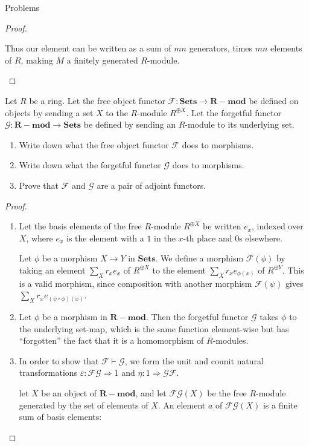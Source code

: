 \documentclass[12pt]{article}
\theoremstyle{definition}
\newenvironment{problem}[2][Problem]{\begin{trivlist}
\item[\hskip \labelsep {\bfseries #1}\hskip \labelsep {\bfseries #2.}]}{\end{trivlist}}
\begin{document}
\begin{section}{Problems}
\begin{proof}
\begin{enumerate}[label=(\alph*)]
			Thus our element can be written as a sum of $mn$ generators, times $mn$ elements of $R$, making $M$ a finitely generated $R$-module.
	\end{enumerate} 
\end{proof}
\begin{problem}{2}
	Let $R$ be a ring. Let the free object functor $\mathcal{F} : \mathbf{Sets} \to \mathbf{R-mod}$ be defined on objects by sending a set $X$ to the $R$-module $R^{\oplus X}$. Let the forgetful functor $\mathcal{G} : \mathbf{R-mod} \to \mathbf{Sets}$ be defined by sending an $R$-module to its underlying set.
	\begin{enumerate}[label=(\alph*)]
		\item Write down what the free object functor $\mathcal{F}$ does to morphisms.
		\item Write down what the forgetful functor $\mathcal{G}$ does to morphisms.
		\item Prove that $\mathcal{F}$ and $\mathcal{G}$ are a pair of adjoint functors.
	\end{enumerate}
\end{problem}
\begin{proof}
	\begin{enumerate}[label=(\alph*)]
		\item Let the basis elements of the free $R$-module $R^{\oplus X}$ be written $e_x$, indexed over $X$, where $e_x$ is the element with a $1$ in the $x$-th place and $0$s elsewhere. 
		\par Let $\phi$ be a morphism $X \to Y$ in $\mathbf{Sets}$. We define a morphism $\mathcal{F}(\phi)$ by taking an element $\sum_{X} r_x e_x$ of $R^{\oplus X}$ to the element $\sum_{X} r_x e_{\phi(x)}$ of $R^{\oplus Y}$. This is a valid morphism, since composition with another morphism $\mathcal{F}(\psi)$ gives $\sum_{X} r_x e_{(\psi \circ \phi)(x)}$.
	\item Let $\phi$ be a morphism in $\mathbf{R-mod}$. Then the forgetful functor $\mathcal{G}$ takes $\phi$ to the underlying set-map, which is the same function element-wise but has ``forgotten'' the fact that it is a homomorphism of $R$-modules.
	\item In order to show that $\mathcal{F} \vdash \mathcal{G}$, we form the unit and counit natural transformations $\varepsilon :  \mathcal{FG} \Rightarrow 1$ and $\eta : 1 \Rightarrow \mathcal{GF}$. 
		\par let $X$ be an object of $\mathbf{R-mod}$, and let $\mathcal{FG}(X)$ be the free $R$-module generated by the set of elements of $X$. An element $a $ of $\mathcal{FG}(X)$ is a finite sum of basis elements:

\end{enumerate}
\end{proof}
\end{section}
\end{document}

